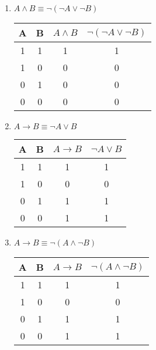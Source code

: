 \documentclass{article}
\begin{document}
\begin{enumerate}
    \item $A \wedge B \equiv \neg(\neg A \vee \neg B)$
    \begin{table}[h!]
        \centering
        \begin{tabular}{|c|c|c||c|}
            \hline
            \textbf{A} & \textbf{B} & \textbf{$A \wedge B$} & \textbf{$\neg(\neg A \vee \neg B)$}\\
            \hline
            1 & 1 & 1 & 1 \\
            \hline
            1 & 0 & 0 & 0 \\
            \hline
            0 & 1 & 0 & 0 \\
            \hline
            0 & 0 & 0 & 0 \\
            \hline
        \end{tabular}
    \end{table}

    \item $A \rightarrow B \equiv \neg A \vee B$
    \begin{table}[h!]
        \centering
        \begin{tabular}{|c|c|c||c|}
            \hline
            \textbf{A} & \textbf{B} & \textbf{$A \rightarrow B$} & \textbf{$\neg A \vee B$}\\
            \hline
            1 & 1 & 1 & 1 \\
            \hline
            1 & 0 & 0 & 0 \\
            \hline
            0 & 1 & 1 & 1 \\
            \hline
            0 & 0 & 1 & 1 \\
            \hline
        \end{tabular}
    \end{table}

    \item $A \rightarrow B \equiv \neg(A \wedge \neg B)$
    \begin{table}[h!]
        \centering
        \begin{tabular}{|c|c|c||c|}
            \hline
            \textbf{A} & \textbf{B} & \textbf{$A \rightarrow B$} & \textbf{$\neg(A \wedge \neg B)$}\\
            \hline
            1 & 1 & 1 & 1 \\
            \hline
            1 & 0 & 0 & 0 \\
            \hline
            0 & 1 & 1 & 1 \\
            \hline
            0 & 0 & 1 & 1 \\
            \hline
        \end{tabular}
    \end{table}
    \newpage


\end{enumerate}
\end{document}

